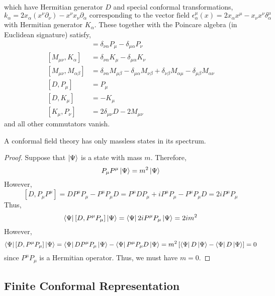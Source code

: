 \documentclass[12pt]{extarticle}
\begin{document}
which have Hermitian generator $D$ and special conformal transformations,
\[ k_\alpha = 2 x_\alpha (x^\nu \partial_\nu) - x^\nu x_\nu \partial_\alpha \text{ corresponding to the vector field } \epsilon_\alpha^\mu(x) = 2 x_\alpha x^\mu - x_\nu x^\nu \delta^\mu_\alpha  \]
with Hermitian generator $K_\alpha$. These together with the Poincare algebra (in Euclidean signature) satisfy,
\begin{align*}
[M_{\mu \nu}, P_\alpha] & = \delta_{\nu \alpha} P_\mu - \delta_{\mu \alpha} P_\nu 
\\
[M_{\mu \nu}, K_{\alpha}] & = \delta_{\nu \alpha} K_\mu - \delta_{\mu \alpha} K_{\nu}
\\
[M_{\mu \nu}, M_{\alpha \beta}] & = \delta_{\nu \alpha} M_{\mu \beta} - \delta_{\mu \alpha} M_{\nu \beta} + \delta_{\nu \beta} M_{\alpha \mu} - \delta_{\mu \beta} M_{\alpha \nu} 
\\
[D, P_\mu] & = P_\mu
\\
[D, K_\mu] & = - K_\mu
\\
[K_\mu, P_\nu] & = 2 \delta_{\mu \nu} D - 2 M_{\mu \nu} 
\end{align*}
and all other commutators vanish. 
\begin{theorem}
A conformal field theory has only massless states in its spectrum. 
\end{theorem}

\begin{proof}
Suppose that $\left| \Psi \right>$ is a state with mass $m$. Therefore,
\[ P_\mu P^\mu \left| \Psi \right> = m^2 \left| \Psi \right> \]
However,
\[ [D, P_\mu P^\mu] = D P^\mu P_\mu - P^\mu P_\mu D = P^\mu D P_\mu + i P^\mu P_\mu   - P^\mu P_\mu D = 2 i P^\mu P_\mu \]
Thus,
\[ \left< \Psi \right| [D, P^\mu P_\mu] \left| \Psi \right> = \left< \Psi \right| 2i P^\mu P_\mu \left| \Psi \right> = 2i m^2 \]
However,
\[ \left< \Psi \right| [D, P^\mu P_\mu] \left| \Psi \right> = \left< \Psi \right| D P^\mu P_\mu \left| \Psi \right> - \left< \Psi \right| P^\mu P_\mu D \left| \Psi \right> = m^2 \left[ \left< \Psi \right| D \left| \Psi \right> - \left< \Psi \right| D \left| \Psi \right> \right] = 0 \]
since $P^\mu P_\mu$ is a Hermitian operator. 
Thus, we must have $m = 0$. 
\end{proof}


\subsection{Finite Conformal Representation}
\end{document}
